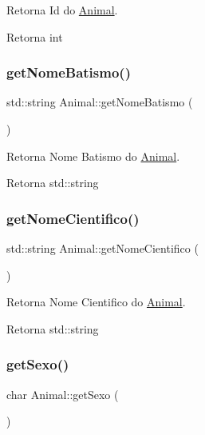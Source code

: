 Retorna Id do \hyperlink{classAnimal}{Animal}. 

\begin{DoxyReturn}{Retorna}
int 
\end{DoxyReturn}
\mbox{\label{classAnimal_aee0219bd596f0af49fa51fcdad29a1a7}} 
\subsubsection{\texorpdfstring{get\+Nome\+Batismo()}{getNomeBatismo()}}
{\footnotesize\ttfamily std\+::string Animal\+::get\+Nome\+Batismo (\begin{DoxyParamCaption}{ }\end{DoxyParamCaption})}



Retorna Nome Batismo do \hyperlink{classAnimal}{Animal}. 

\begin{DoxyReturn}{Retorna}
std\+::string 
\end{DoxyReturn}
\mbox{\label{classAnimal_a9b316bf80a121cd5dc077158055c162f}} 
\subsubsection{\texorpdfstring{get\+Nome\+Cientifico()}{getNomeCientifico()}}
{\footnotesize\ttfamily std\+::string Animal\+::get\+Nome\+Cientifico (\begin{DoxyParamCaption}{ }\end{DoxyParamCaption})}



Retorna Nome Cientifico do \hyperlink{classAnimal}{Animal}. 

\begin{DoxyReturn}{Retorna}
std\+::string 
\end{DoxyReturn}
\mbox{\label{classAnimal_a7349027418d900a9cd7cfc32001b6f7d}} 
\subsubsection{\texorpdfstring{get\+Sexo()}{getSexo()}}
{\footnotesize\ttfamily char Animal\+::get\+Sexo (\begin{DoxyParamCaption}{ }\end{DoxyParamCaption})}




